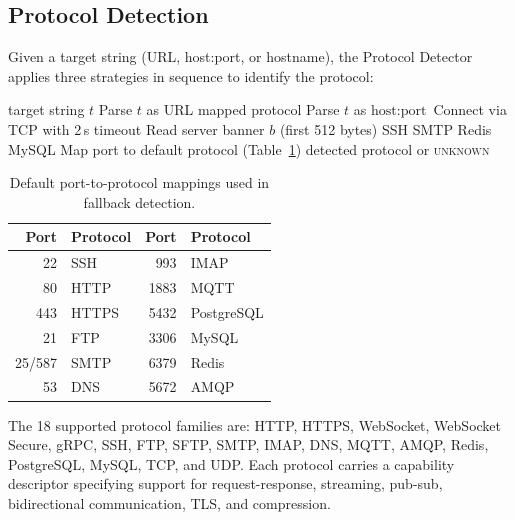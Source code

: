 \documentclass[10pt, twocolumn]{article}
\begin{document}
\subsection{Protocol Detection}
\label{sec:protocols}

Given a target string (URL, host:port, or hostname), the Protocol Detector applies three strategies in sequence to identify the protocol:

\begin{algorithm}[h]
\caption{Protocol Detection}
\label{alg:detect}
\begin{algorithmic}[1]
\REQUIRE target string $t$
\STATE Parse $t$ as URL
  \RETURN mapped protocol
\ENDIF
\STATE Parse $t$ as $\text{host}:\text{port}$
\STATE Connect via TCP with 2\,s timeout
\STATE Read server banner $b$ (first 512 bytes)
  \RETURN SSH
  \RETURN SMTP
  \RETURN Redis
  \RETURN MySQL
\ENDIF
\STATE Map port to default protocol (Table~\ref{tab:ports})
\RETURN detected protocol or \textsc{unknown}
\end{algorithmic}
\end{algorithm}

\begin{table}[h]
\caption{Default port-to-protocol mappings used in fallback detection.}
\label{tab:ports}
\centering
\scriptsize
\begin{tabular}{@{}rlrl@{}}
\toprule
\textbf{Port} & \textbf{Protocol} & \textbf{Port} & \textbf{Protocol} \\
\midrule
22 & SSH & 993 & IMAP \\
80 & HTTP & 1883 & MQTT \\
443 & HTTPS & 5432 & PostgreSQL \\
21 & FTP & 3306 & MySQL \\
25/587 & SMTP & 6379 & Redis \\
53 & DNS & 5672 & AMQP \\
\bottomrule
\end{tabular}
\end{table}

The 18 supported protocol families are: HTTP, HTTPS, WebSocket, WebSocket Secure, gRPC, SSH, FTP, SFTP, SMTP, IMAP, DNS, MQTT, AMQP, Redis, PostgreSQL, MySQL, TCP, and UDP. Each protocol carries a capability descriptor specifying support for request-response, streaming, pub-sub, bidirectional communication, TLS, and compression.
\end{document}
